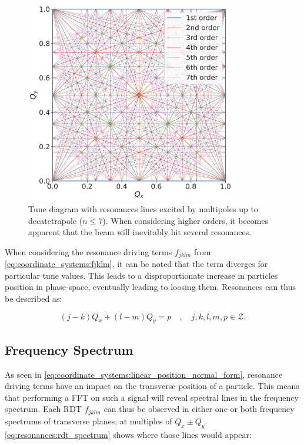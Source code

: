 \begin{figure}[H]
    \centering
    \includegraphics[width=0.82\textwidth]{images/resonance_diagram_n7.pdf}
    \caption{Tune diagram with resonances lines excited by multipoles up to decatetrapole 
             ($n \leq 7$). When considering higher orders, it becomes apparent that the beam will
             inevitably hit several resonances.}
    \label{fig:resonances:diagram_n7}
\end{figure}


When considering the resonance driving terms $f_{jklm}$ from \cref{eq:coordinate_systems:fjklm}, it
can be noted that the term diverges for particular tune values. This leads to a disproportionate
increase in particles position in phase-space, eventually leading to loosing them.
Resonances can thus be described as:

\begin{equation}
    (j-k)Q_x + (l-m)Q_y = p \quad,\quad j,k,l,m,p \in \mathcal{Z}.
\end{equation}
    


\subsection{Frequency Spectrum}

As seen in \cref{eq:coordinate_systems:linear_position_normal_form}, resonance driving terms have an
impact on the transverse position of a particle. This means that performing a FFT on such a signal
will reveal spectral lines in the frequency spectrum.
Each RDT $f_{jklm}$ can thus be observed in either one or both frequency spectrums of transverse
planes, at multiples of $Q_x \pm Q_y$. \cref{eq:resonances:rdt_spectrum} shows where those lines
would appear:


